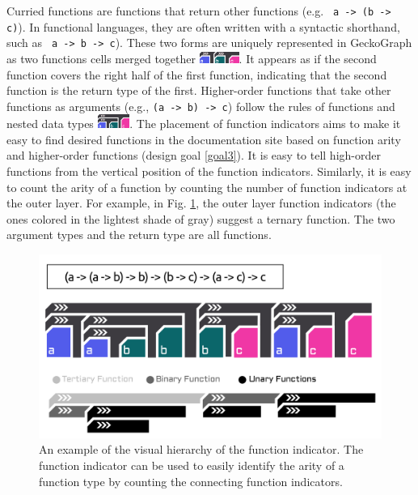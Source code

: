 \documentclass[preprint,12pt]{elsarticle}
\begin{document}
Curried functions are functions that return other functions (e.g. \texttt{ a -> (b -> c)}). In functional languages, they are often written with a syntactic shorthand, such as \texttt{ a -> b -> c}). These two forms are uniquely represented in GeckoGraph as two functions cells merged together \includegraphics[height=1em]{figures/Curry.png}. It appears as if the second function covers the right half of the first function, indicating that the second function is the return type of the first.  Higher-order functions that take other functions as arguments  (e.g., \texttt{(a -> b) -> c}) follow the rules of functions and nested data types \includegraphics[height=1.2em]{figures/HOF.png}. The placement of function indicators aims to make it easy to find desired functions in the documentation site based on function arity and higher-order functions (design goal \ref{goal3}). It is easy to tell high-order functions from the vertical position of the function indicators. Similarly, it is easy to count the arity of a function by counting the number of function indicators at the outer layer. For example, in Fig. \ref{fig:indicator}, the outer layer function indicators (the ones colored in the lightest shade of gray) suggest a ternary function. The two argument types and the return type are all functions.

\begin{figure}[h]
  \includegraphics[width=0.6\linewidth]{figures/Indicator.png}
  \caption{
        \label{fig:indicator}
        An example of the visual hierarchy of the function indicator. The function indicator can be used to easily identify the arity of a function type by counting the connecting function indicators.
  }
\end{figure}

 
\end{document}
